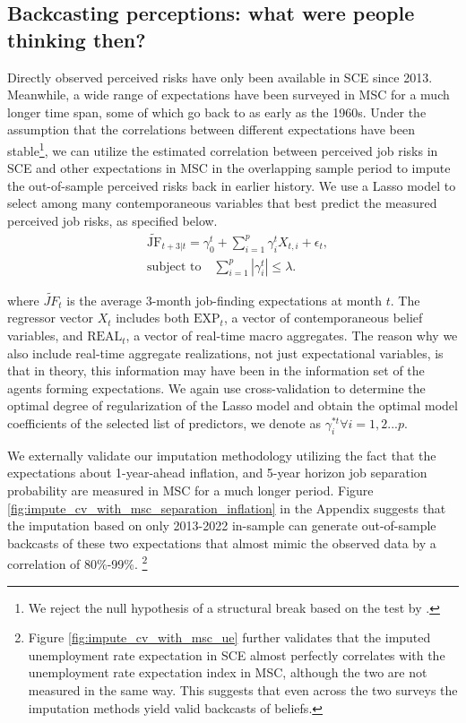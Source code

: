 \subsection{Backcasting perceptions: what were people thinking then?}
\label{subsec:imputing}

Directly observed perceived risks have only been available in SCE since 2013. Meanwhile, a wide range of expectations have been surveyed in MSC for a much longer time span, some of which go back to as early as the 1960s. Under the assumption that the correlations between different expectations have been stable\footnote{We reject the null hypothesis of a structural break based on the test by \citet{andrews1993tests}.}, we can utilize the estimated correlation between perceived job risks in SCE and other expectations in MSC in the overlapping sample period to impute the out-of-sample perceived risks back in earlier history. We use a Lasso model to select among many contemporaneous variables that best predict the measured perceived job risks, as specified below. 
\begin{equation}
\begin{split}
    & \widetilde{\text{JF}}_{t+3|t} = \gamma_0^t + \sum_{i=1}^{p} \gamma_i^t X_{t,i} + \epsilon_t, \\
    &  \text{subject to} \quad \sum_{i=1}^{p} |\gamma_i^t| \leq \lambda.
\end{split}
\end{equation}

where $\widetilde{JF}_t$ is the average 3-month job-finding expectations at month $t$. The regressor vector $X_t$ includes both $\text{EXP}_t$,  a vector of contemporaneous belief variables, and $\text{REAL}_t$, a vector of real-time macro aggregates. The reason why we also include real-time aggregate realizations, not just expectational variables, is that in theory, this information may have been in the information set of the agents forming expectations. We again use cross-validation to determine the optimal degree of regularization of the Lasso model and obtain the optimal model coefficients of the selected list of predictors, we denote as $\gamma^{*t}_i\forall i=1,2...p$. 

We externally validate our imputation methodology utilizing the fact that the expectations about 1-year-ahead inflation, and 5-year horizon job separation probability are measured in MSC for a much longer period. Figure \ref{fig:impute_cv_with_msc_separation_inflation} in the Appendix suggests that the imputation based on only 2013-2022 in-sample can generate out-of-sample backcasts of these two expectations that almost mimic the observed data by a correlation of 80\%-99\%. \footnote{Figure \ref{fig:impute_cv_with_msc_ue} further validates that the imputed unemployment rate expectation in SCE almost perfectly correlates with the unemployment rate expectation index in MSC, although the two are not measured in the same way. This suggests that even across the two surveys the imputation methods yield valid backcasts of beliefs.} 

